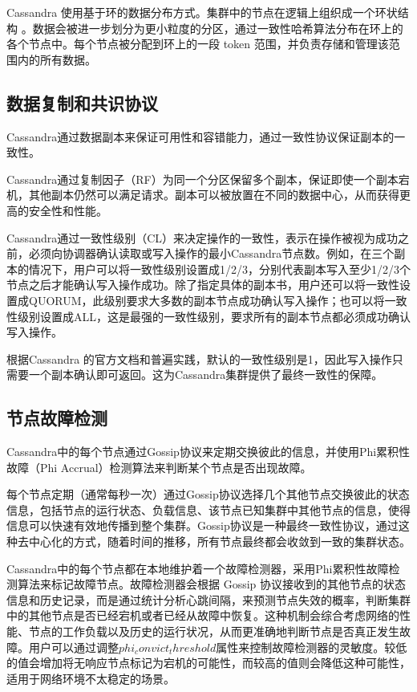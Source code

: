Cassandra 使用基于环的数据分布方式。集群中的节点在逻辑上组织成一个环状结构 。数据会被进一步划分为更小粒度的分区，通过一致性哈希算法\cite{karger1997consistent}分布在环上的各个节点中。每个节点被分配到环上的一段 token 范围，并负责存储和管理该范围内的所有数据。

\subsection{数据复制和共识协议}



Cassandra通过数据副本来保证可用性和容错能力，通过一致性协议保证副本的一致性。

Cassandra通过复制因子（RF）为同一个分区保留多个副本，保证即使一个副本宕机，其他副本仍然可以满足请求。副本可以被放置在不同的数据中心，从而获得更高的安全性和性能。

Cassandra通过一致性级别（CL）来决定操作的一致性，表示在操作被视为成功之前，必须向协调器确认读取或写入操作的最小Cassandra节点数。例如，在三个副本的情况下，用户可以将一致性级别设置成1/2/3，分别代表副本写入至少1/2/3个节点之后才能确认写入操作成功。除了指定具体的副本书，用户还可以将一致性设置成QUORUM，此级别要求大多数的副本节点成功确认写入操作；也可以将一致性级别设置成ALL，这是最强的一致性级别，要求所有的副本节点都必须成功确认写入操作。

根据Cassandra 的官方文档和普遍实践，默认的一致性级别是1，因此写入操作只需要一个副本确认即可返回。这为Cassandra集群提供了最终一致性的保障。

\subsection{节点故障检测}\label{sec:cassandra-failure-detecttion}

Cassandra中的每个节点通过Gossip协议来定期交换彼此的信息，并使用Phi累积性故障（Phi Accrual）检测算法\cite{hayashibara2004spl}来判断某个节点是否出现故障。

每个节点定期（通常每秒一次）通过Gossip协议选择几个其他节点交换彼此的状态信息，包括节点的运行状态、负载信息、该节点已知集群中其他节点的信息，使得信息可以快速有效地传播到整个集群。Gossip协议是一种最终一致性协议，通过这种去中心化的方式，随着时间的推移，所有节点最终都会收敛到一致的集群状态。

Cassandra中的每个节点都在本地维护着一个故障检测器，采用Phi累积性故障检测算法来标记故障节点。故障检测器会根据 Gossip 协议接收到的其他节点的状态信息和历史记录，而是通过统计分析心跳间隔，来预测节点失效的概率，判断集群中的其他节点是否已经宕机或者已经从故障中恢复。这种机制会综合考虑网络的性能、节点的工作负载以及历史的运行状况，从而更准确地判断节点是否真正发生故障。用户可以通过调整$phi_convict_threshold$属性来控制故障检测器的灵敏度。较低的值会增加将无响应节点标记为宕机的可能性，而较高的值则会降低这种可能性，适用于网络环境不太稳定的场景。


